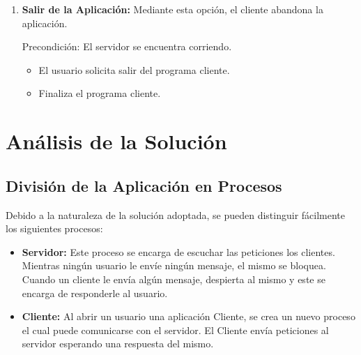 \documentclass[a4paper,10pt]{article}
\begin{document}
\begin{enumerate}
                \begin{itemize}
                   \item El usuario solicita al programa cliente la eliminaci\'on de un registro. 
                   \item El programa cliente solicita el n\'umero de registro que se desea eliminar. 
                  \item El programa cliente envía la petici\'on de eliminaci\'on al servidor. 
                   \item El servidor realiza la petici\'on y env\'ia el resultado al cliente. 
			\item El cliente recibe la respuesta del servidor y la muestra al usuario (E1).
			\item El cliente regresa al men\'u principal.
                \end{itemize}
               E1) El n\'umero de registro ingresado no existe. 
		\begin{itemize}
			\item El cliente notifica el error al usuario.
			\item El cliente regresa al men\'u principal.
		\end{itemize}
		\item \textbf{Salir de la Aplicaci\'on:} Mediante esta opci\'on, el cliente abandona la aplicaci\'on.

                Precondici\'on: El servidor se encuentra corriendo. 
                
                \begin{itemize}
                    \item El usuario solicita salir del programa cliente.
                    \item Finaliza el programa cliente.
                \end{itemize}
			\end{enumerate}

	\section{An\'alisis de la Soluci\'on}
		\subsection{Divisi\'on de la Aplicaci\'on en Procesos}
			Debido a la naturaleza de la soluci\'on adoptada, se pueden distinguir f\'acilmente los siguientes procesos:

			\begin{itemize}
				\item \textbf{Servidor:} Este proceso se encarga de escuchar las peticiones los clientes. Mientras ning\'un usuario le env\'ie ning\'un 
				mensaje, el mismo se bloquea. Cuando un cliente le env\'ia alg\'un mensaje, despierta al mismo y este se encarga de responderle al 
				usuario.
				\item \textbf{Cliente:} Al abrir un usuario una aplicaci\'on Cliente, se crea un nuevo proceso el cual puede comunicarse con el servidor.
				El Cliente env\'ia peticiones al servidor esperando una respuesta del mismo.
			\end{itemize}
\end{document}
